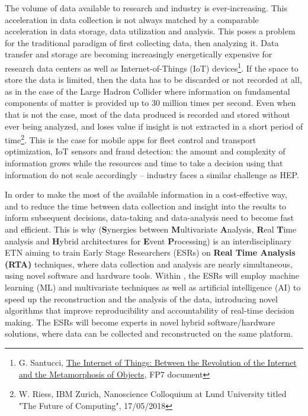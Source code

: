 \vspace{-2mm}

The volume of data available to research and industry is ever-increasing. 
This acceleration in data collection is not always matched by a comparable acceleration in data storage, data utilization and analysis. 
This poses a problem for the traditional paradigm of first collecting data, then analyzing it. 
Data transfer and storage are becoming increasingly energetically expensive for research data centers as well as Internet-of-Things (IoT) devices\footnote{G. Santucci, \href{http://cordis.europa.eu/fp7/ict/enet/documents/publications/iot-between-the-internet-revolution.pdf}{The Internet of Things: Between the Revolution of the Internet and the Metamorphosis of Objects}, FP7 document}. 
If the space to store the data is limited, then the data has to be discarded or not recorded at all, as in the case of the Large Hadron Collider where information on fundamental components of matter is provided up to 30 million times per second. 
Even when that is not the case, most of the data produced is recorded and stored without ever being analyzed, and loses value if insight is not extracted in a short period of time\footnote{W. Riess, IBM Zurich, Nanoscience Colloquium at Lund University titled "The Future of Computing", 17/05/2018}. This is the case for mobile apps for fleet control and transport optimization, IoT sensors and fraud detection: the amount and complexity of information grows while the resources and time to take a decision using that information do not scale accordingly -- industry faces a similar challenge as HEP. 

In order to make the most of the available information in a cost-effective way, and to reduce the time between data collection and insight into the results to inform subsequent decisions, data-taking and data-analysis need to become fast and efficient. 
This is why \acronym ({\color{blue}\textbf{S}}ynergies between {\color{blue}\textbf{M}}ultivariate {\color{blue}\textbf{A}}nalysis, {\color{blue}\textbf{R}}eal {\color{blue}\textbf{T}}ime analysis and {\color{blue}\textbf{H}}ybrid architectures for {\color{blue}\textbf{E}}vent {\color{blue}\textbf{P}}rocessing) is an interdisciplinary ETN aiming to train Early Stage Researchers (ESRs) on \textbf{Real Time Analysis (RTA)} techniques, where data collection and analysis are nearly simultaneous, using novel software and hardware tools. 
Within \acronym, the ESRs will employ machine learning (ML) and multivariate techniques as well as artificial intelligence (AI) to speed up the reconstruction and the analysis of the data, introducing novel algorithms that improve reproducibility and accountability of real-time decision making. 
The ESRs will become experts in novel hybrid software/hardware solutions, where data can be collected and reconstructed on the same platform. 

